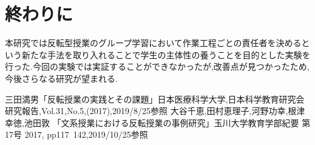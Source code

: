 \documentclass[twocolumn,10pt,a4j]{jsarticle}
\begin{document}
\section{終わりに}
本研究では反転型授業のグループ学習において作業工程ごとの責任者を決めるという新たな手法を取り入れることで学生の主体性の養うことを目的とした実験を行った.今回の実験では実証することができなかったが,改善点が見つかったため,今後さらなる研究が望まれる.
\begin{thebibliography}{99}
 三田満男「反転授業の実践とその課題」日本医療科学大学,日本科学教育研究会研究報告,Vol.31,No.5,(2017),2019/8/25参照
 大谷千恵,田村恵理子,河野功幸,根津幸徳,池田敦 「文系授業における反転授業の事例研究」玉川大学教育学部紀要 第17号 2017, pp117~142,2019/10/25参照
\end{thebibliography}
\end{document}
